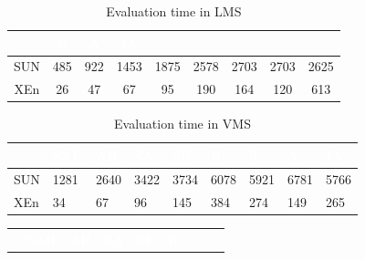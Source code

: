 {\begin{table}[h!]
\begin{tabular}{|>{\tiny}c|>{\tiny}c|>{\tiny}c|>{\tiny}c|>{\tiny}c|>{\tiny}c|>{\tiny}c|>{\tiny}c|>{\tiny}c|}
& \scriptsize \bf \textcolor  {white}{S} 
& \scriptsize \bf \textcolor  {white}{A}
& \scriptsize \bf \textcolor {white}{IA}\\ \hline
\scriptsize  {SUN }
&\scriptsize  {485}
& \scriptsize {922}
& \scriptsize {1453}
& \scriptsize {1875}
& \scriptsize {2578}

& \scriptsize {2703}
& \scriptsize {2703}
& \scriptsize {2625}
  \\ \hline
\scriptsize  {XEn}
&\scriptsize  {26}
& \scriptsize {47}
& \scriptsize {67}
& \scriptsize {95}
& \scriptsize {190}

& \scriptsize {164}
& \scriptsize {120}
& \scriptsize {613}
  \\ \hline
\end{tabular}
\caption{Evaluation time in LMS}\end{table}



\begin{table}[h!]
\centering
\begin{tabular}{|l|l|l|l|l|l|l|l|l|}   
\hline  \rowcolor{black} \scriptsize \bf \textcolor {white}{}
& \scriptsize \bf \textcolor {white}{SAR}
& \scriptsize \bf \textcolor {white}{AR}
& \scriptsize \bf \textcolor  {white}{SA}
& \scriptsize \bf \textcolor  {white}{SR}
& \scriptsize \bf \textcolor  {white}{R}

& \scriptsize \bf \textcolor  {white}{S} 
& \scriptsize \bf \textcolor  {white}{A}

& \scriptsize \bf \textcolor {white}{IA}\\ \hline

\scriptsize  {SUN }
& \scriptsize  {1281}
& \scriptsize {2640}
& \scriptsize {3422}
& \scriptsize {3734}
& \scriptsize {6078}

& \scriptsize {5921}
& \scriptsize {6781}
& \scriptsize {5766}
  \\ \hline
\scriptsize  {XEn}
& \scriptsize  {34}
& \scriptsize {67}
& \scriptsize {96}
& \scriptsize {145}
& \scriptsize {384}

& \scriptsize {274}
& \scriptsize {149}
& \scriptsize {265}
  \\ \hline
\end{tabular}
\caption{Evaluation time in VMS}\end{table}

\begin{table}[h!]
\centering
\begin{tabular}{|l|l|l|l|l|l|l|l|l|}   
\hline  \rowcolor{black} \scriptsize \bf \textcolor {white}{}
& \scriptsize \bf \textcolor {white}{SAR}
& \scriptsize \bf \textcolor {white}{AR}
& \scriptsize \bf \textcolor  {white}{SA}
& \scriptsize \bf \textcolor  {white}{SR}
& \scriptsize \bf \textcolor  {white}{R}


\end{tabular}
\end{table}}
